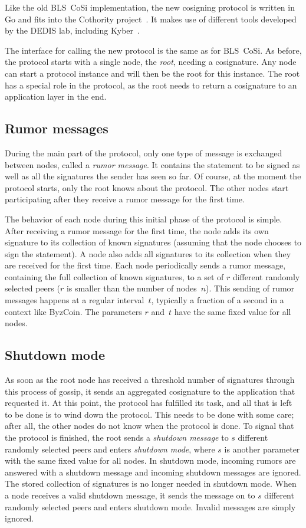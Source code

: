 Like the old BLS~CoSi implementation, the new cosigning protocol is written in Go and fits into the Cothority project~\cite{Coth}.
It makes use of different tools developed by the DEDIS lab, including Kyber~\cite{Kyber}.

The interface for calling the new protocol is the same as for BLS~CoSi.
As before, the protocol starts with a single node, the \emph{root}, needing a cosignature.
Any node can start a protocol instance and will then be the root for this instance.
The root has a special role in the protocol, as the root needs to return a cosignature to an application layer in the end.


\subsection{Rumor messages}

During the main part of the protocol, only one type of message is exchanged between nodes, called a \emph{rumor message}.
It contains the statement to be signed as well as all the signatures the sender has seen so far.
Of course, at the moment the protocol starts, only the root knows about the protocol.
The other nodes start participating after they receive a rumor message for the first time.

The behavior of each node during this initial phase of the protocol is simple.
After receiving a rumor message for the first time, the node adds its own signature to its collection of known signatures (assuming that the node chooses to sign the statement).
A node also adds all signatures to its collection when they are received for the first time.
Each node periodically sends a rumor message, containing the full collection of known signatures, to a set of $r$ different randomly selected peers ($r$ is smaller than the number of nodes~$n$).
This sending of rumor messages happens at a regular interval~$t$, typically a fraction of a second in a context like ByzCoin.
The parameters $r$ and~$t$ have the same fixed value for all nodes.


\subsection{Shutdown mode}

As soon as the root node has received a threshold number of signatures through this process of gossip, it sends an aggregated cosignature to the application that requested it.
At this point, the protocol has fulfilled its task, and all that is left to be done is to wind down the protocol.
This needs to be done with some care; after all, the other nodes do not know when the protocol is done.
To signal that the protocol is finished, the root sends a \emph{shutdown message} to $s$ different randomly selected peers and enters \emph{shutdown mode}, where $s$ is another parameter with the same fixed value for all nodes.
In shutdown mode, incoming rumors are answered with a shutdown message and incoming shutdown messages are ignored.
The stored collection of signatures is no longer needed in shutdown mode.
When a node receives a valid shutdown message, it sends the message on to $s$ different randomly selected peers and enters shutdown mode.
Invalid messages are simply ignored.

